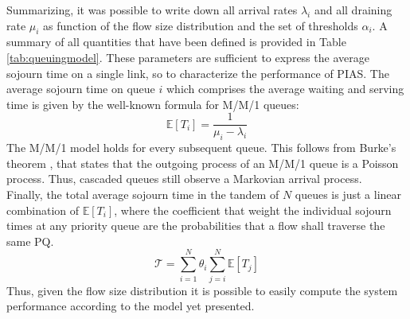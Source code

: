 \begin{table}%
	\footnotesize 
	\centering
	\caption{Variables of the model.}
		\label{tab:queuingmodel}
\end{table}

Summarizing, it was possible to write down all arrival rates $\lambda_{i}$ and all draining rate $\mu_i$ as function of the flow size distribution and the set of thresholds $\alpha_i$. A summary of all quantities that have been defined is provided in Table \ref{tab:queuingmodel}.
These parameters are sufficient to express the average sojourn time on a single link, so to characterize the performance of PIAS. The average sojourn time on queue $i$ which comprises the average waiting and serving time is given by the well-known formula for M/M/1 queues:
\begin{equation}
\label{mm1}
\mathbb{E}[T_i] = \dfrac{1}{\mu_i-\lambda_i}
\end{equation}
The M/M/1 model holds for every subsequent queue. This follows from Burke's theorem \cite{burke}, that states that the outgoing process of an M/M/1 queue is a Poisson process. Thus, cascaded queues still observe a Markovian arrival process. \\
Finally, the total average sojourn time in the tandem of $N$ queues is just a linear combination of $\mathbb{E}[T_i]$, where the coefficient that weight the individual sojourn times at any priority queue are the probabilities that a flow shall traverse the same PQ.
\begin{equation}
\mathcal{T} = 
\sum_{i=1}^{N} \theta_i \sum_{j=i}^{N}\mathbb{E}[T_j]
\end{equation}
Thus, given the flow size distribution it is possible to easily compute the system performance according to the model yet presented. 

